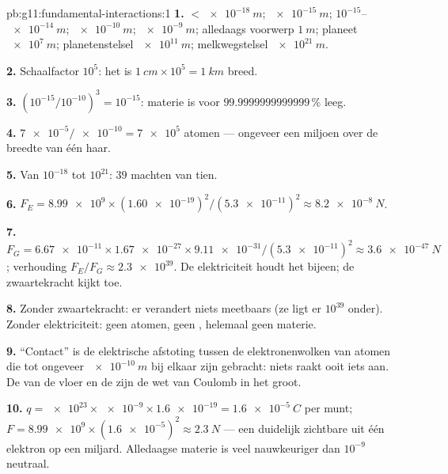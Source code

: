 \begin{solution}{pb:g11:fundamental-interactions:1}
\textbf{1.}  $< \qty{e-18}{m}$;  $\qty{e-15}{m}$; 
$10^{-15}$--$\qty{e-14}{m}$;  $\qty{e-10}{m}$; 
$\qty{e-9}{m}$; alledaags voorwerp $\qty{1}{m}$; planeet $\qty{e7}{m}$;
planetenstelsel $\qty{e11}{m}$; melkwegstelsel $\qty{e21}{m}$.

\textbf{2.} Schaalfactor $10^{5}$: het  is
$\qty{1}{cm} \times 10^{5} = \qty{1}{km}$ breed.

\textbf{3.} $(10^{-15}/10^{-10})^3 = 10^{-15}$: materie is voor
$\num{99.9999999999999}\,\%$ leeg.

\textbf{4.} $\num{7e-5}/\num{e-10} = \num{7e5}$ atomen --- ongeveer een
miljoen over de breedte van één haar.

\textbf{5.} Van $10^{-18}$ tot $10^{21}$: $39$ machten van tien.

\textbf{6.} $F_E = \num{8.99e9} \times (\num{1.60e-19})^2 /
(\num{5.3e-11})^2 \approx \qty{8.2e-8}{N}$.

\textbf{7.} $F_G = \num{6.67e-11} \times \num{1.67e-27} \times
\num{9.11e-31}/(\num{5.3e-11})^2 \approx \qty{3.6e-47}{N}$; verhouding
$F_E/F_G \approx \num{2.3e39}$. De elektriciteit houdt het  bijeen;
de zwaartekracht kijkt toe.

\textbf{8.} Zonder zwaartekracht: er verandert niets meetbaars (ze ligt
er $10^{39}$ onder). Zonder elektriciteit: geen atomen, geen ,
helemaal geen materie.

\textbf{9.} ``Contact'' is de elektrische afstoting tussen de
elektronenwolken van atomen die tot ongeveer $\qty{e-10}{m}$ bij elkaar
zijn gebracht: niets raakt ooit iets aan. De  van de vloer
en de  zijn de wet van Coulomb in het groot.

\textbf{10.} $q = \num{e23} \times \num{e-9} \times \num{1.6e-19} =
\qty{1.6e-5}{C}$ per munt;
$F = \num{8.99e9} \times (\num{1.6e-5})^2 \approx \qty{2.3}{N}$ --- een
duidelijk zichtbare  uit één elektron op een miljard. Alledaagse
materie is veel nauwkeuriger dan $10^{-9}$ neutraal.


\end{solution}
